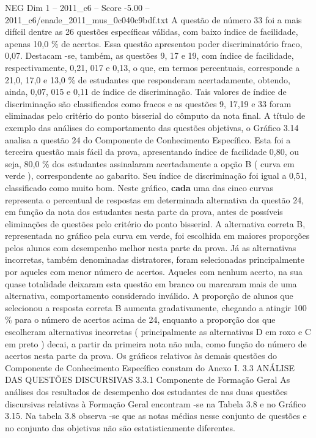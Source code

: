 \begin{textsample}{NEG Dim 1 – 2011\_c6 – Score -5.00 – 2011\_c6/enade\_2011\_mus\_0c040c9bdf.txt}
A questão de número 33 foi a mais difícil dentre as 26 questões específicas válidas, com baixo índice de facilidade, apenas 10,0 \% de acertos.
Essa questão apresentou poder discriminatório fraco, 0,07.
Destacam -se, também, as questões 9, 17 e 19, com índice de facilidade, respectivamente, 0,21, 017 e 0,13, o que, em termos percentuais, corresponde a 21,0, 17,0 e 13,0 \% de estudantes que responderam acertadamente, obtendo, ainda, 0,07, 015 e 0,11 de índice de discriminação.
Tais valores de índice de discriminação são classificados como fracos e as questões 9, 17,19 e 33 foram eliminadas pelo critério do ponto bisserial do cômputo da nota final.
A título de exemplo das análises do comportamento das questões objetivas, o Gráfico 3.14 analisa a questão 24 do Componente de Conhecimento Específico.
Esta foi a terceira questão mais fácil da prova, apresentando índice de facilidade 0,80, ou seja, 80,0 \% dos estudantes assinalaram acertadamente a opção B ( curva em verde ), correspondente ao gabarito.
Seu índice de discriminação foi igual a 0,51, classificado como muito bom.
Neste gráfico, \textbf{cada} uma das cinco curvas representa o percentual de respostas em determinada alternativa da questão 24, em função da nota dos estudantes nesta parte da prova, antes de possíveis eliminações de questões pelo critério do ponto bisserial.
A alternativa correta B, representada no gráfico pela curva em verde, foi escolhida em maiores proporções pelos alunos com desempenho melhor nesta parte da prova.
Já as alternativas incorretas, também denominadas distratores, foram selecionadas principalmente por aqueles com menor número de acertos.
Aqueles com nenhum acerto, na sua quase totalidade deixaram esta questão em branco ou marcaram mais de uma alternativa, comportamento considerado inválido.
A proporção de alunos que selecionou a resposta correta B aumenta gradativamente, chegando a atingir 100 \% para o número de acertos acima de 24, enquanto a proporção dos que escolheram alternativas incorretas ( principalmente as alternativas D em roxo e C em preto ) decai, a partir da primeira nota não nula, como função do número de acertos nesta parte da prova.
Os gráficos relativos às demais questões do Componente de Conhecimento Específico constam do Anexo I. 3.3 ANÁLISE DAS QUESTÕES DISCURSIVAS 3.3.1 Componente de Formação Geral As análises dos resultados de desempenho dos estudantes de nas duas questões discursivas relativas à Formação Geral encontram -se na Tabela 3.8 e no Gráfico 3.15.
Na tabela 3.8 observa -se que as notas médias nesse conjunto de questões e no conjunto das objetivas não são estatisticamente diferentes.

\end{textsample}
